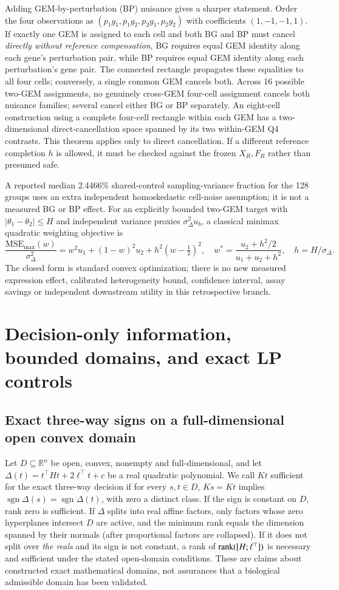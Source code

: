 Adding GEM-by-perturbation (BP) nuisance gives a sharper statement. Order the four observations as $(p_1g_1,p_1g_2,p_2g_1,p_2g_2)$ with coefficients $(1,-1,-1,1)$. If exactly one GEM is assigned to each cell and both BG and BP must cancel \emph{directly without reference compensation}, BG requires equal GEM identity along each gene's perturbation pair, while BP requires equal GEM identity along each perturbation's gene pair. The connected rectangle propagates these equalities to all four cells; conversely, a single common GEM cancels both. Across 16 possible two-GEM assignments, no genuinely cross-GEM four-cell assignment cancels both nuisance families; several cancel either BG or BP separately. An eight-cell construction using a complete four-cell rectangle within each GEM has a two-dimensional direct-cancellation space spanned by its two within-GEM Q4 contrasts. This theorem applies only to direct cancellation. If a different reference completion $h$ is allowed, it must be checked against the frozen $X_R,F_R$ rather than presumed safe.

A reported median 2.4466\% shared-control sampling-variance fraction for the 128 groups uses an extra independent homoskedastic cell-noise assumption; it is not a measured BG or BP effect. For an explicitly bounded two-GEM target with $|\theta_1-\theta_2|\le H$ and independent variance proxies $\sigma_\Delta^2 u_b$, a classical minimax quadratic weighting objective is
\[
\frac{\mathrm{MSE}_{\max}(w)}{\sigma_\Delta^2}
=w^2u_1+(1-w)^2u_2+h^2(w-\tfrac12)^2,\quad
w^*=\frac{u_2+h^2/2}{u_1+u_2+h^2},\quad h=H/\sigma_\Delta.
\]
The closed form is standard convex optimization; there is no new measured expression effect, calibrated heterogeneity bound, confidence interval, assay savings or independent downstream utility in this retrospective branch.

\section{Decision-only information, bounded domains, and exact LP controls}
\label{supp:decision}
\subsection{Exact three-way signs on a full-dimensional open convex domain}
Let $D\subseteq\mathbb R^n$ be open, convex, nonempty and full-dimensional, and let $\Delta(t)=t^\top Ht+2\ell^\top t+c$ be a real quadratic polynomial. We call $Kt$ sufficient for the exact three-way decision if for every $s,t\in D$, $Ks=Kt$ implies $\operatorname{sgn}\Delta(s)=\operatorname{sgn}\Delta(t)$, with zero a distinct class. If the sign is constant on $D$, rank zero is sufficient. If $\Delta$ splits into real affine factors, only factors whose zero hyperplanes intersect $D$ are active, and the minimum rank equals the dimension spanned by their normals (after proportional factors are collapsed). If it does not split over \emph{the reals} and its sign is not constant, a rank of $\operatorname{rank}([H;\ell^\top])$ is necessary and sufficient under the stated open-domain conditions. These are claims about constructed exact mathematical domains, not assurances that a biological admissible domain has been validated.

